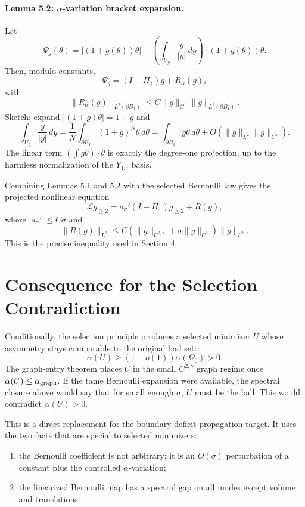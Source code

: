 \documentclass[11pt]{article}
\begin{document}
\paragraph{Lemma 5.2: \(\alpha\)-variation bracket expansion.}
Let
\[
\Psi_g(\theta)
=
|(1+g(\theta))\theta|
-
\left(\int_{U_g}\frac{y}{|y|}\,dy\right)\cdot(1+g(\theta))\theta .
\]
Then, modulo constants,
\[
\Psi_g=(I-\Pi_1)g+R_\alpha(g),
\]
with
\[
\|R_\alpha(g)\|_{L^2(\partial B_1)}
\le
C\|g\|_{C^1}\|g\|_{L^2(\partial B_1)}.
\]
Sketch: expand \(|(1+g)\theta|=1+g\) and
\[
\int_{U_g}\frac{y}{|y|}\,dy
=
\frac1N\int_{\partial B_1}(1+g)^N\theta\,d\theta
=
\int_{\partial B_1}g\theta\,d\theta+O(\|g\|_{L^2}\|g\|_{C^1}).
\]
The linear term \((\int g\theta)\cdot\theta\) is exactly the degree-one
projection, up to the harmless normalization of the \(Y_{1,i}\) basis.

Combining Lemmas 5.1 and 5.2 with the selected Bernoulli law gives the
projected nonlinear equation
\[
\mathcal L g_{\ge2}
=
a_\sigma'(I-\Pi_1)g_{\ge2}
+R(g),
\]
where \(|a_\sigma'|\le C\sigma\) and
\[
\|R(g)\|_{L^2}
\le C(\|g\|_{C^{2,\gamma}}+\sigma\|g\|_{C^1})\|g\|_{L^2}.
\]
This is the precise inequality used in Section 4.

\section{Consequence for the Selection Contradiction}

Conditionally, the selection principle produces a selected minimizer \(U\) whose asymmetry
stays comparable to the original bad set:
\[
\alpha(U)\ge (1-o(1))\alpha(\Omega_0)>0.
\]
The graph-entry theorem places \(U\) in the small \(C^{2,\gamma}\) graph regime
once \(\alpha(U)\le\alpha_{\rm graph}\). If the tame Bernoulli expansion were
available, the spectral closure above would say that for small enough
\(\sigma\), \(U\) must be the ball. This would contradict \(\alpha(U)>0\).

This is a direct replacement for the boundary-deficit propagation target. It
uses the two facts that are special to selected minimizers:
\begin{enumerate}
\item the Bernoulli coefficient is not arbitrary; it is an \(O(\sigma)\)
perturbation of a constant plus the controlled \(\alpha\)-variation;
\item the linearized Bernoulli map has a spectral gap on all modes except
volume and translations.
\end{enumerate}
\end{document}

